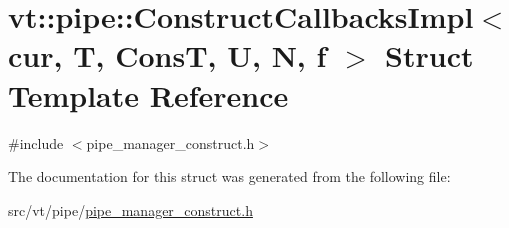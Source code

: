 \hypertarget{structvt_1_1pipe_1_1_construct_callbacks_impl}{}\section{vt\+:\+:pipe\+:\+:Construct\+Callbacks\+Impl$<$ cur, T, ConsT, U, N, f $>$ Struct Template Reference}
\label{structvt_1_1pipe_1_1_construct_callbacks_impl}


{\ttfamily \#include $<$pipe\+\_\+manager\+\_\+construct.\+h$>$}



The documentation for this struct was generated from the following file\+:\begin{DoxyCompactItemize}
\item 
src/vt/pipe/\hyperlink{pipe__manager__construct_8h}{pipe\+\_\+manager\+\_\+construct.\+h}\end{DoxyCompactItemize}
